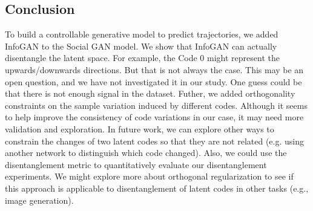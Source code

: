 \subsection{Conclusion}
To build a controllable generative model to predict trajectories, we added InfoGAN to the Social GAN model. We show that InfoGAN can actually disentangle the latent space. For example, the Code 0 might represent the upwards/downwards directions. But that is not always the case. This may be an open question, and we have not investigated it in our study. One guess could be that there is not enough signal in the dataset. Futher, we added orthogonality constraints on the sample variation induced by different codes. Although it seems to help improve the consistency of code variations in our case, it may need more validation and exploration. In future work, we can explore other ways to constrain the changes of two latent codes so that they are not related (e.g. using another network to distinguish which code changed). Also, we could use the disentanglement metric to quantitatively evaluate our disentanglement experiments. We might explore more about orthogonal regularization to see if this approach is applicable to disentanglement of latent codes in other tasks (e.g., image generation).